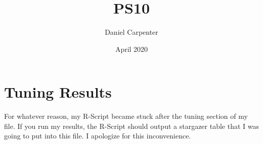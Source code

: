 \documentclass{article}
\title{PS10}
\author{Daniel Carpenter }
\date{April 2020}
\begin{document}
\maketitle

\section{Tuning Results}
    For whatever reason, my R-Script became stuck after
    the tuning section of my file. If you run my results,
    the R-Script should output a stargazer table
    that I was going to put into this file. I apologize for this inconvenience.
\end{document}
